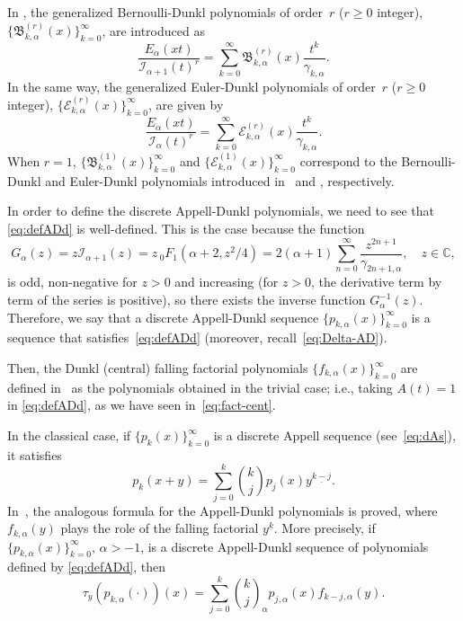 \documentclass[11pt]{article}
\theoremstyle{plain}
\theoremstyle{remark}
\numberwithin{equation}{section} %
\newcommand{\Ea}{E_{\alpha}}
\newcommand{\binoma}[2]{\binom{#1}{#2}_{\!\alpha}}
\newcommand{\I}{\mathcal{I}}
\newcommand{\B}{\mathfrak{B}}
\newcommand{\E}{\mathcal{E}}
\newcommand{\CC}{\mathbb{C}}
\begin{document}
In \cite{CMV}, the generalized Bernoulli-Dunkl polynomials of order~$r$ ($r\ge 0$ integer), $\{\B_{k,\alpha}^{(r)}(x)\}_{k=0}^{\infty}$, are introduced as
\begin{equation}
\label{eq:B-D-gener}
  \frac{\Ea(xt)}{\I_{\alpha+1}(t)^r} 
  = \sum_{k=0}^{\infty} \B_{k,\alpha}^{(r)}(x) \frac{t^k}{\gamma_{k,\alpha}}.
\end{equation}
In the same way, the generalized Euler-Dunkl polynomials of order~$r$ ($r\ge 0$ integer), $\{\E_{k,\alpha}^{(r)}(x)\}_{k=0}^{\infty}$, are given by
\begin{equation}
\label{eq:E-D-gener}
  \frac{\Ea(xt)}{\I_{\alpha}(t)^r} 
  = \sum_{k=0}^{\infty} \E_{k,\alpha}^{(r)}(x) \frac{t^k}{\gamma_{k,\alpha}}.
\end{equation}
When $r=1$, $\{\B_{k,\alpha}^{(1)}(x)\}_{k=0}^{\infty}$ and $\{\E_{k,\alpha}^{(1)}(x)\}_{k=0}^{\infty}$ correspond to the Bernoulli-Dunkl and Euler-Dunkl polynomials introduced in~\cite{CDPV} and \cite{DPV}, respectively.
 
In order to define the discrete Appell-Dunkl polynomials, we need to see that \eqref{eq:defADd} is well-defined. This is the case because the function
\[
  G_{\alpha}(z) = z \I_{\alpha+1}(z) = z \,{}_0F_1(\alpha+2,z^2/4)
  = 2(\alpha+1) \sum_{n=0}^\infty \frac{z^{2n+1}}{\gamma_{2n+1,\alpha}},
\quad z\in\CC,
\]
is odd, non-negative for $z>0$ and increasing (for $z>0$, the derivative term by term of the series is positive),
so there exists the inverse function $G^{-1}_{\alpha}(z)$. 
Therefore, we say that a discrete Appell-Dunkl sequence $\{p_{k,\alpha}(x)\}_{k=0}^{\infty}$ is a sequence that satisfies~\eqref{eq:defADd} (moreover, recall~\eqref{eq:Delta-AD}).

Then, the Dunkl (central) falling factorial polynomials $\{f_{k,\alpha}(x)\}_{k=0}^{\infty}$ are defined in~\cite[\S\,3]{ELMV} as the polynomials obtained in the trivial case; i.e., taking $A(t)=1$ in \eqref{eq:defADd}, as we have seen in~\eqref{eq:fact-cent}.

In the classical case, if $\{p_k(x)\}_{k=0}^{\infty}$ is a discrete Appell
sequence (see~\eqref{eq:dAs}), it satisfies
\begin{equation*}
  p_k(x+y) = \sum_{j=0}^k \binom{k}{j} p_j(x)y^{\underline{k-j}}.
\end{equation*}
In~\cite[Theorem~3.1]{ELMV}, the analogous formula for the Appell-Dunkl polynomials is proved, where $f_{k,\alpha}(y)$ plays the role of the falling factorial $y^{\underline{k}}$. More precisely, if $\{p_{k,\alpha}(x)\}_{k=0}^{\infty}$, $\alpha>-1$, is a discrete Appell-Dunkl sequence of polynomials defined by \eqref{eq:defADd}, then
\begin{equation}
\label{eq:sum-AD}
  \tau_y(p_{k,\alpha}(\cdot))(x)
  = \sum_{j=0}^k \binoma{k}{j} p_{j,\alpha}(x) f_{k-j,\alpha}(y).
\end{equation}
\end{document}

